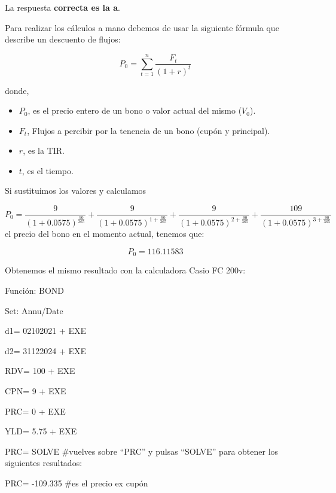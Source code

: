 \documentclass[
  letterpaper,
  DIV=11,
  numbers=noendperiod]{scrreprt}
\begin{document}
\begin{tcolorbox}
\begin{tcolorbox}[enhanced jigsaw, toprule=.15mm, left=2mm, breakable, opacitybacktitle=0.6, toptitle=1mm, coltitle=black, arc=.35mm, leftrule=.75mm, bottomtitle=1mm, titlerule=0mm, title=\textcolor{quarto-callout-tip-color}{\faLightbulb}\hspace{0.5em}{Solución}, rightrule=.15mm, opacityback=0, bottomrule=.15mm, colback=white, colframe=quarto-callout-tip-color-frame, colbacktitle=quarto-callout-tip-color!10!white]

La respuesta \textbf{correcta es la a}.

Para realizar los cálculos a mano debemos de usar la siguiente fórmula
que describe un descuento de flujos:

\[P_0=\sum_{ t=1}^{ n}\frac{F_t}{(1+r)^{t}}\]

donde,

\begin{itemize}
\item
  \(P_0\), es el precio entero de un bono o valor actual del mismo
  (\(V_0\)).
\item
  \(F_t\), Flujos a percibir por la tenencia de un bono (cupón y
  principal).
\item
  \(r\), es la TIR.
\item
  \(t\), es el tiempo.
\end{itemize}

Si sustituimos los valores y calculamos

\[P_0=\frac{9}{\left(1+0.0575\right)^{\frac{90}{365}}}+\frac{9}{\left(1+0.0575\right)^{1+\frac{90}{365}}}+\frac{9}{\left(1+0.0575\right)^{2+\frac{90}{365}}}+\frac{109}{\left(1+0.0575\right)^{3+\frac{90}{365}}}\]
el precio del bono en el momento actual, tenemos que:

\[P_0=116.11583\]

Obtenemos el mismo resultado con la calculadora Casio FC 200v:

Función: BOND

Set: Annu/Date

d1= 02102021 + EXE

d2= 31122024 + EXE

RDV= 100 + EXE

CPN= 9 + EXE

PRC= 0 + EXE

YLD= 5.75 + EXE

PRC= SOLVE \#vuelves sobre ``PRC'' y pulsas ``SOLVE'' para obtener los
siguientes resultados:

PRC= -109.335 \#es el precio ex cupón


\end{tcolorbox}
\end{tcolorbox}
\end{document}
